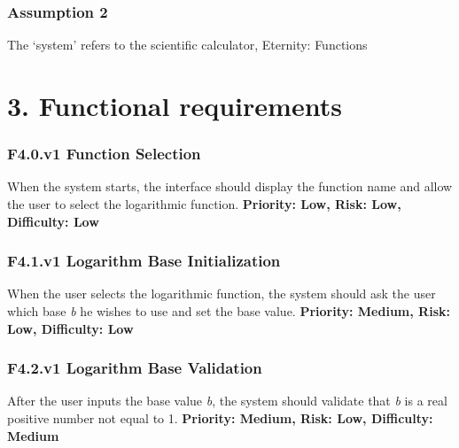 \documentclass{article}
\begin{document}
\subsubsection[Assumption 2 ]{\textbf{{Assumption 2 }}}
{The `system' refers to the scientific calculator, Eternity: Functions}

\section[3. Functional requirements]{\textbf{{3. Functional requirements}}}
\subsubsection[F4.0.v1 Function Selection ]{\textbf{{F4.0.v1 Function Selection }}}
{When the system starts, the interface should display the function name and allow the user to select
the logarithmic function.} \textbf{ Priority: Low, Risk: Low, Difficulty: Low}

\subsubsection[F4.1.v1 Logarithm Base Initialization ]{\textbf{{F4.1.v1 Logarithm Base Initialization
}}}
{When the user selects the logarithmic function, the system should ask the user which base
}\textit{{b}}{ he wishes to use and set the base value.}\textbf{ Priority: Medium, Risk: Low, Difficulty: Low}

\subsubsection[F4.2.v1 Logarithm Base Validation]{\textbf{{F4.2.v1 Logarithm Base Validation}}}
{After the user inputs the base value }\textit{{b}}{, the system
should validate that }\textit{{b}}{ is a real positive number not equal to 1.}\textbf{ Priority: Medium, Risk: Low, Difficulty: Medium}
\end{document}
